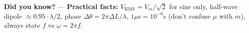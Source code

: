 \begin{tcolorbox}[
  colback=SoftYellow,
  colframe=IEEEblue!70!black,
  boxrule=0.5pt,
  arc=0mm,
  left=3mm, right=3mm, top=0.5mm, bottom=0.5mm
]
\small\RaggedRight \textbf{\color{IEEEblue!75!black}Did you know?} — \textbf{Practical facts:} $V_{\mathrm{RMS}}=V_m/\sqrt2$ for sine only, half-wave dipole $\approx0.95\cdot\lambda/2$, phase $\Delta\theta=2\pi\Delta L/\lambda$, $1\mu$s$=10^{-6}$s (don't confuse $\mu$ with $m$), always state $f$ vs $\omega=2\pi f$.
\end{tcolorbox}
